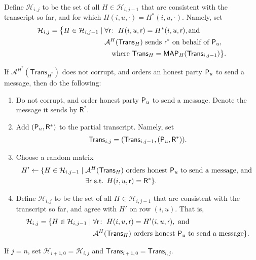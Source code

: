 \documentclass[11pt]{article}
\theoremstyle{plain}
\theoremstyle{definition}
\numberwithin{equation}{section}
\numberwithin{equation}{section} \newcommand{\aka} {also known as\ }
\newcommand{\Hc}{\mathcal H}
\newcommand{\1}{\mathbf{1}}
\newcommand{\Adv}{\mathcal A}
\newcommand{\lo}{{\mathsf{R}}}
\newcommand{\sh}{{\mathsf{r}}}
\newcommand{\trans}{{\mathsf{Trans}}}
\newcommand{\MAP}{\mathsf{MAP}}
\theoremstyle{remark}
\begin{document}
\begin{algorithm}
\begin{MyEnumerate}
\begin{MyEnumerate}{}
    \item\label{it:4d} Define $\Hc_{i,j}$ to be the set of all $H\in\Hc_{i,j-1}$
      that are consistent with the transcript so far, and for which
      $H(i,u,\cdot) = H^*(i,u,\cdot)$. Namely, set
        \begin{align*}
          \Hc_{i,j} = \big\{ H \in \Hc_{i,j-1}\mid\;& \forall \sh\colon\;
          H(i,u,\sh) = H^*(i,u,\sh), \text{and} \\
          & \text{$\Adv^H(\trans_H)$ sends $\sh^*$ on behalf of $\party{u}$},
            \\
            & \quad \text{where $\trans_H=\MAP_H(\trans_{i,j-1})$} \big\}.
        \end{align*}
      \end{MyEnumerate}
    \item\label{it:5} If $\Adv^{H^*}(\trans_{H^*})$ does not corrupt, and orders
      an honest party $\mathsf{P}_{{u}}$ to send a message, then do the following:
    \begin{enumerate}
    \item Do not corrupt, and order honest party $\mathsf{P}_{{u}}$ to send a
      message. Denote the message it sends by $\lo^*$.
     \item Add $(\party{u},\lo^*)$ to the partial transcript.  Namely, set
      \begin{align*}
        \trans_{i,j}=(\trans_{i,j-1},(\party{u},\lo^*)).
      \end{align*}
    \item Choose a random matrix
      \begin{align*}
        H'\leftarrow \{H\in \Hc_{i,j-1} \mid\; & \Adv^H(\trans_H) \text{ orders
          honest
          $\party{u}$ to send a message, and } \\
        & \exists \sh \text{ s.t. }H(i,u,\sh)=\lo^* \}.
      \end{align*}

    \item\label{it:5c} Define $\Hc_{i,j}$ to be the set of all $H\in
      \Hc_{i,j-1}$ that are consistent with the transcript so far, and agree
      with $H'$ on row $(i,u)$. That is,
      \begin{align*}
        \Hc_{i,j} = \{ H \in \Hc_{i,j-1} \mid\;& \forall \sh\colon\;
        H(i,u,\sh) = H'(i,u,\sh), \text{ and }\\
        & \Adv^H(\trans_H) \text{ orders honest
          $\party{u}$ to send a message}\}.
      \end{align*}
       \end{enumerate}
  \item\label{it6} If $j=n$, set $\Hc_{i+1,0} = \Hc_{i,j}$ and $\trans_{i+1,0} =
    \trans_{i,j}$.
  \end{MyEnumerate}
\end{algorithm}
\end{document}

